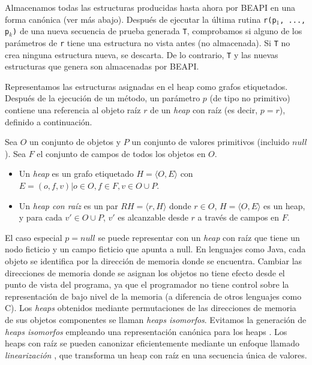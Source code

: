 Almacenamos todas las estructuras producidas hasta ahora por \textsf{BEAPI} en una forma canónica (ver más abajo). Después de ejecutar la última rutina \texttt{r(p$_1$, ..., p$_k$)} de una nueva secuencia de prueba generada \texttt{T}, comprobamos si alguno de los parámetros de \texttt{r} tiene una estructura no vista antes (no almacenada). Si \texttt{T} no crea ninguna estructura nueva, se descarta. De lo contrario, \texttt{T} y las nuevas estructuras que genera son almacenadas por \textsf{BEAPI}.

Representamos las estructuras asignadas en el heap como grafos etiquetados. Después de la ejecución de un método, un parámetro $p$ (de tipo no primitivo) contiene una referencia al objeto raíz $r$ de un \emph{heap} con raíz (es decir, $p=r$), definido a continuación.

\begin{definition}
Sea $O$ un conjunto de objetos y $P$ un conjunto de valores primitivos (incluido $null$). Sea $F$ el conjunto de campos de todos los objetos en $O$.
\begin{itemize}
\item Un \emph{heap} es un grafo etiquetado $H = \langle O, E\rangle$ con $E = {(o, f, v) | o \in O, f \in F, v \in O \cup P}$.
\item Un \emph{heap con raíz} es un par $RH = \langle r, H \rangle$ donde $r \in O$, $H = \langle O, E\rangle$ es un heap, y para cada $v' \in O \cup P$, $v'$ es alcanzable desde $r$ a través de campos en $F$.
\end{itemize}
\end{definition}

El caso especial $p = null$ se puede representar con un \emph{heap} con raíz que tiene un nodo ficticio y un campo ficticio que apunta a null. En lenguajes como Java, cada objeto se identifica por la dirección de memoria donde se encuentra. Cambiar las direcciones de memoria donde se asignan los objetos no tiene efecto desde el punto de vista del programa, ya que el programador no tiene control sobre la representación de bajo nivel de la memoria (a diferencia de otros lenguajes como C). Los \emph{heaps} obtenidos mediante permutaciones de las direcciones de memoria de sus objetos componentes se llaman \emph{heaps isomorfos}. Evitamos la generación de \emph{heaps isomorfos} empleando una representación canónica para los heaps \cite{Iosif02,Boyapati02}. Los heaps con raíz se pueden canonizar eficientemente mediante un enfoque llamado \emph{linearización} \cite{Iosif02,Xie04}, que transforma un heap con raíz en una secuencia única de valores.

